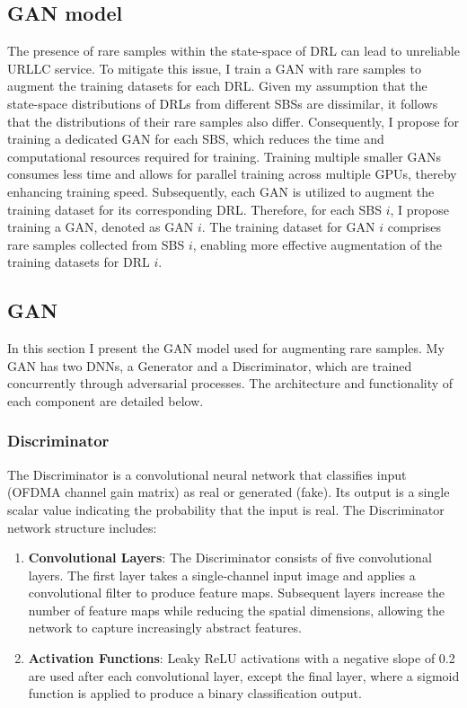 \documentclass[letterpaper%
, twoside%
, 12pt%
,memoire%
, english%
,creativecommons,hyperref, withAlgo2e %
]{thETS}
\numberwithin{algorithm}{chapter}
\begin{document}
\subsection{GAN model}

The presence of rare samples within the state-space of DRL can lead to unreliable URLLC service. To mitigate this issue, I train a GAN with rare samples to augment the training datasets for each DRL. Given my  assumption that the state-space distributions of DRLs from different SBSs are dissimilar, it follows that the distributions of their rare samples also differ. Consequently, I propose for training a dedicated GAN for each SBS, which reduces the time and computational resources required for training. Training multiple smaller GANs consumes less time and allows for parallel training across multiple GPUs, thereby enhancing training speed. Subsequently, each GAN is utilized to augment the training dataset for its corresponding DRL. Therefore, for each SBS $i$, I propose training a GAN, denoted as GAN $i$. The training dataset for GAN $i$ comprises rare samples collected from SBS $i$, enabling more effective augmentation of the training datasets for DRL $i$.




\subsection{GAN}
In this section I present the GAN model used for augmenting rare samples. My GAN has two DNNs, a Generator and a Discriminator, which are trained concurrently through adversarial processes. The architecture and functionality of each component are detailed below.


\subsubsection{Discriminator}


The Discriminator is a convolutional neural network that classifies input (OFDMA channel gain matrix) as real or generated (fake). Its output is a single scalar value indicating the probability that the input is real. The Discriminator network structure includes:

\begin{enumerate}
    \item \textbf{Convolutional Layers}: The Discriminator consists of five convolutional layers. The first layer takes a single-channel input image and applies a convolutional filter to produce feature maps. Subsequent layers increase the number of feature maps while reducing the spatial dimensions, allowing the network to capture increasingly abstract features.
   

\item  \textbf{Activation Functions}: Leaky ReLU activations with a negative slope of 0.2 are used after each convolutional layer, except the final layer, where a sigmoid function is applied to produce a binary classification output.
\end{enumerate}
\end{document}
